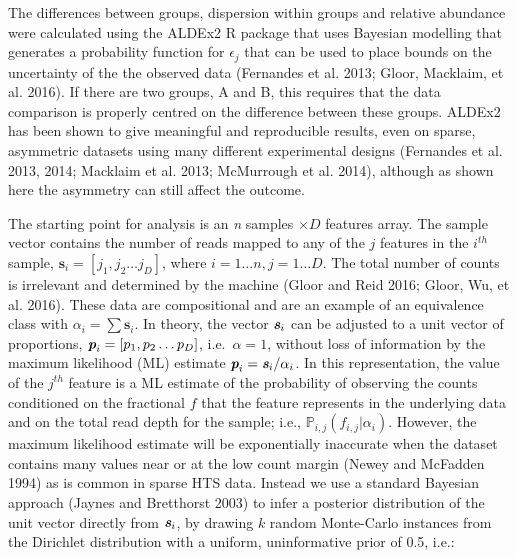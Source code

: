 \documentclass[onecolumn]{article}
\begin{document}
The differences between groups, dispersion within groups and relative abundance were calculated using the ALDEx2 R package that uses Bayesian modelling that generates a probability function for \(\epsilon_j\) that can be used to place bounds on the uncertainty of the the observed data (Fernandes et al. 2013; Gloor, Macklaim, et al. 2016). If there are two groups, A and B, this requires that the data comparison is properly centred on the difference between these groups. ALDEx2 has been shown to give meaningful and reproducible results, even on sparse, asymmetric datasets using many different experimental designs (Fernandes et al. 2013, 2014; Macklaim et al. 2013; McMurrough et al. 2014), although as shown here the asymmetry can still affect the outcome.

The starting point for analysis is an \emph{n} samples \(\times D\) features array. The sample vector contains the number of reads mapped to any of the \(j\) features in the \(i^{th}\) sample, \(\textbf{s}_i=[j_1,j_2 \ldots j_D]\), where \(i=1 \ldots n , j=1 \ldots D\). The total number of counts is irrelevant and determined by the machine (Gloor and Reid 2016; Gloor, Wu, et al. 2016). These data are compositional and are an example of an equivalence class with \(\alpha_{i} = \sum \textbf{s}_{i}\). In theory, the vector \(\textit{\textbf{s}}_i\) can be adjusted to a unit vector of proportions, \({\textit{\textbf{p}}_i=[p_1,p_2 \ldots p_D] }\), i.e.~\(\alpha=1\), without loss of information by the maximum likelihood (ML) estimate \(\textit{\textbf{p}}_i=\textit{\textbf{s}}_i / \alpha_{i}\). In this representation, the value of the \(j^{th}\) feature is a ML estimate of the probability of observing the counts conditioned on the fractional \(f\) that the feature represents in the underlying data and on the total read depth for the sample; i.e., \(\mathbb{P}_{i,j}(f_{i,j}|\alpha_i)\). However, the maximum likelihood estimate will be exponentially inaccurate when the dataset contains many values near or at the low count margin (Newey and McFadden 1994) as is common in sparse HTS data. Instead we use a standard Bayesian approach (Jaynes and Bretthorst 2003) to infer a posterior distribution of the unit vector directly from \(\textit{\textbf{s}}_i\), by drawing \(k\) random Monte-Carlo instances from the Dirichlet distribution with a uniform, uninformative prior of 0.5, i.e.:
\end{document}

